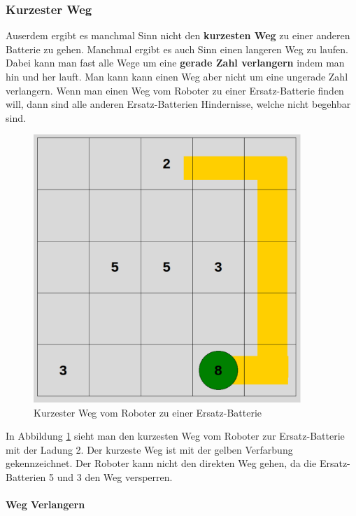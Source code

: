 \documentclass[a4paper,12pt,arial]{scrartcl}
\begin{document}
\subsubsection{Kurzester Weg}
Auserdem ergibt es manchmal Sinn nicht den \textbf{kurzesten Weg} zu einer anderen Batterie zu gehen.
Manchmal ergibt es auch Sinn einen langeren Weg zu laufen. Dabei kann man fast alle Wege um eine \textbf{gerade Zahl verlangern} indem man hin und her lauft. Man kann kann einen Weg aber nicht um eine ungerade Zahl verlangern.
Wenn man einen Weg vom Roboter zu einer Ersatz-Batterie finden will, dann sind alle anderen Ersatz-Batterien Hindernisse, welche nicht begehbar sind.
\begin{figure}[h]
    \centering
    \includegraphics[width=0.9\textwidth]{shortest_w.pdf}
    \caption{Kurzester Weg vom Roboter zu einer Ersatz-Batterie}
    \label{fig:kurzester_weg}
\end{figure}
\par
In Abbildung \ref{fig:kurzester_weg} sieht man den kurzesten Weg vom Roboter zur Ersatz-Batterie mit der Ladung 2. Der kurzeste Weg ist mit der gelben Verfarbung gekennzeichnet. Der Roboter kann nicht den direkten Weg gehen, da die Ersatz-Batterien 5 und 3 den Weg versperren.



\paragraph{Weg Verlangern}
\end{document}
